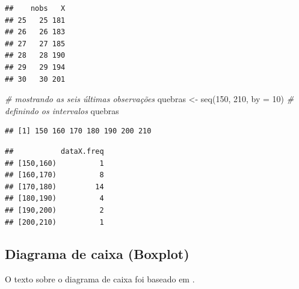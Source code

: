 \documentclass[
]{book}
\newenvironment{Shaded}{\begin{snugshade}}{\end{snugshade}}
\newcommand{\AttributeTok}[1]{\textcolor[rgb]{0.77,0.63,0.00}{#1}}
\newcommand{\CommentTok}[1]{\textcolor[rgb]{0.56,0.35,0.01}{\textit{#1}}}
\newcommand{\ConstantTok}[1]{\textcolor[rgb]{0.00,0.00,0.00}{#1}}
\newcommand{\DecValTok}[1]{\textcolor[rgb]{0.00,0.00,0.81}{#1}}
\newcommand{\FunctionTok}[1]{\textcolor[rgb]{0.00,0.00,0.00}{#1}}
\newcommand{\NormalTok}[1]{#1}
\newcommand{\OtherTok}[1]{\textcolor[rgb]{0.56,0.35,0.01}{#1}}
\newcommand{\SpecialCharTok}[1]{\textcolor[rgb]{0.00,0.00,0.00}{#1}}
\begin{document}
\begin{verbatim}
##    nobs   X
## 25   25 181
## 26   26 183
## 27   27 185
## 28   28 190
## 29   29 194
## 30   30 201
\end{verbatim}

\begin{Shaded}
\begin{Highlighting}[]
\CommentTok{\# mostrando as seis últimas observações}
\NormalTok{quebras }\OtherTok{\textless{}{-}} \FunctionTok{seq}\NormalTok{(}\DecValTok{150}\NormalTok{, }\DecValTok{210}\NormalTok{, }\AttributeTok{by =} \DecValTok{10}\NormalTok{)}
\CommentTok{\# definindo os intervalos}
\NormalTok{quebras}
\end{Highlighting}
\end{Shaded}

\begin{verbatim}
## [1] 150 160 170 180 190 200 210
\end{verbatim}

\begin{Shaded}
\end{Shaded}

\begin{verbatim}
##           dataX.freq
## [150,160)          1
## [160,170)          8
## [170,180)         14
## [180,190)          4
## [190,200)          2
## [200,210)          1
\end{verbatim}

\hypertarget{diagrama-de-caixa-boxplot}{%
\subsection{Diagrama de caixa (Boxplot)}\label{diagrama-de-caixa-boxplot}}

O texto sobre o diagrama de caixa foi baseado em \citet{Morettin2013}.
\end{document}
